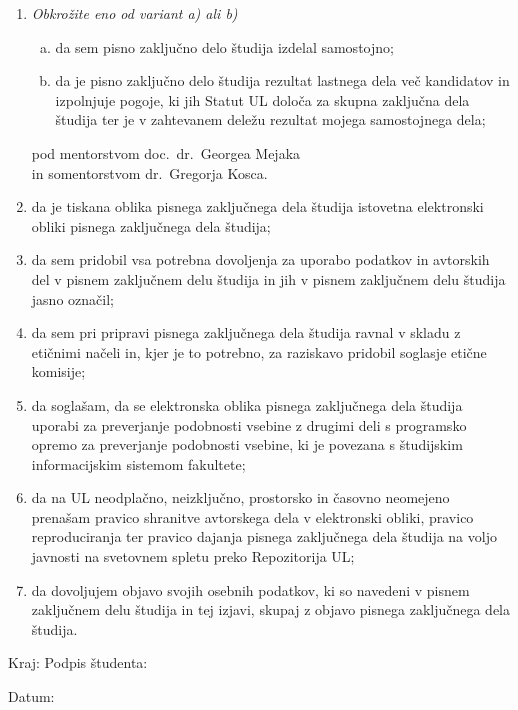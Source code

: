 \documentclass[12pt,a4paper,twoside]{article}
\theoremstyle{definition} %
\theoremstyle{plain} %
\numberwithin{equation}{section}
\begin{document}
\begin{enumerate}[1. ]
  \item \emph{Obkrožite eno od variant a) ali b)}
  \begin{enumerate}[a)]
    \item da sem pisno zaključno delo študija izdelal samostojno;
    \item da je pisno zaključno delo študija rezultat lastnega dela več kandidatov in izpolnjuje
      pogoje, ki jih Statut UL določa za skupna zaključna dela študija ter je v zahtevanem deležu
      rezultat mojega samostojnega dela;
  \end{enumerate}
  pod mentorstvom  doc.~dr.~Georgea Mejaka \\ in somentorstvom dr.~Gregorja Kosca.
  \item da je tiskana oblika pisnega zaključnega dela študija istovetna elektronski obliki
    pisnega zaključnega dela študija;
  \item da sem pridobil vsa potrebna dovoljenja za uporabo podatkov in avtorskih del v pisnem
    zaključnem delu študija in jih v pisnem zaključnem delu študija jasno označil;
  \item da sem pri pripravi pisnega zaključnega dela študija ravnal v skladu z etičnimi načeli in,
    kjer je to potrebno, za raziskavo pridobil soglasje etične komisije;
  \item da soglašam, da se elektronska oblika pisnega zaključnega dela študija uporabi za preverjanje
    podobnosti vsebine z drugimi deli s programsko opremo za preverjanje podobnosti
    vsebine, ki je povezana s študijskim informacijskim sistemom fakultete;
  \item da na UL neodplačno, neizključno, prostorsko in časovno neomejeno prenašam pravico shranitve
    avtorskega dela v elektronski obliki, pravico reproduciranja ter pravico dajanja pisnega
    zaključnega dela študija na voljo javnosti na svetovnem spletu preko Repozitorija UL;
  \item da dovoljujem objavo svojih osebnih podatkov, ki so navedeni v pisnem zaključnem delu študija
    in tej izjavi, skupaj z objavo pisnega zaključnega dela študija.
\end{enumerate}

\vfill

\noindent
Kraj:  \hfill   Podpis študenta: \phantom{prostor za podpis}

\vfill

\noindent
Datum:

\cleardoublepage
\end{document}
